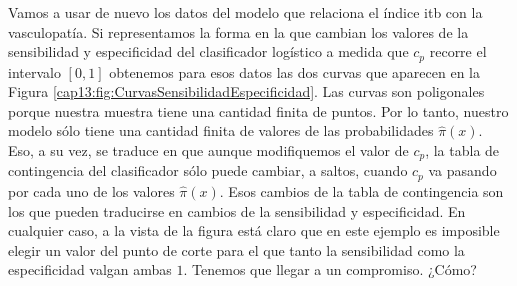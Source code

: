 \begin{ejemplo}
\label{cap13:ejem:CurvasSensibilidadEspecificidad}
Vamos a usar de nuevo los datos del modelo que relaciona el índice itb con la vasculopatía. Si representamos la forma en la que cambian los valores de la sensibilidad y especificidad del clasificador logístico a medida que $c_p$ recorre el intervalo $[0, 1]$ obtenemos para esos datos las dos curvas que aparecen en la Figura \ref{cap13:fig:CurvasSensibilidadEspecificidad}.
Las curvas son poligonales porque nuestra muestra tiene una cantidad finita de puntos. Por lo tanto, nuestro modelo sólo tiene una cantidad finita de valores de las probabilidades $\hat{\pi}(x)$. Eso, a su vez, se traduce en que aunque modifiquemos el valor de $c_p$, la tabla de contingencia del clasificador sólo puede cambiar, a saltos, cuando $c_p$ va pasando por cada uno de los valores $\hat{\pi}(x)$. Esos cambios de la tabla de contingencia son los que pueden traducirse en cambios de la sensibilidad y especificidad.   En cualquier caso, a la vista de la figura  está claro que en este ejemplo es imposible elegir un valor del punto de corte para el que tanto la sensibilidad como la especificidad valgan ambas $1$.  Tenemos que llegar a un compromiso. ¿Cómo?


\end{ejemplo}
